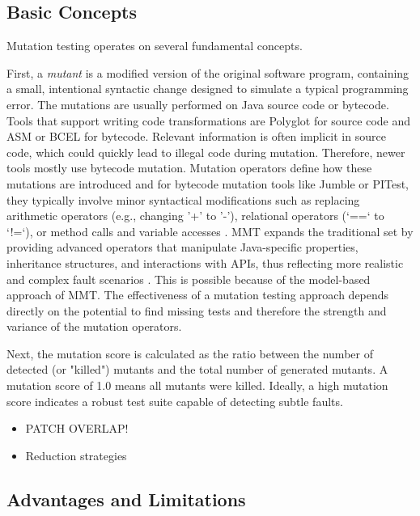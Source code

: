 \documentclass[sigplan, nonacm]{acmart}
\begin{document}
\subsection{Basic Concepts}
Mutation testing operates on several fundamental concepts. 

First, a \textit{mutant} is a modified version of the original software program, containing a small, intentional syntactic change designed to simulate a typical programming error. The mutations are usually performed on Java source code or bytecode. Tools that support writing code transformations are Polyglot for source code and ASM or BCEL for bytecode. Relevant information is often implicit in source code, which could quickly lead to illegal code during mutation. Therefore, newer tools mostly use bytecode mutation. Mutation operators define how these mutations are introduced and for bytecode mutation tools like Jumble or PITest, they typically involve minor syntactical modifications such as replacing arithmetic operators (e.g., changing '+' to '-'), relational operators (`==` to `!=`), or method calls and variable accesses \cite{offutt_mutation_2001}. MMT expands the traditional set by providing advanced operators that manipulate Java-specific properties, inheritance structures, and interactions with APIs, thus reflecting more realistic and complex fault scenarios \cite{bockisch_mmt_2024}. This is possible because of the model-based approach of MMT. The effectiveness of a mutation testing approach depends directly on the potential to find missing tests and therefore the strength and variance of the mutation operators.

Next, the mutation score is calculated as the ratio between the number of detected (or "killed") mutants and the total number of generated mutants. A mutation score of 1.0 means all mutants were killed. Ideally, a high mutation score indicates a robust test suite capable of detecting subtle faults.

\begin{itemize}
    \item PATCH OVERLAP!
    \item Reduction strategies
\end{itemize}

\subsection{Advantages and Limitations}
\end{document}
